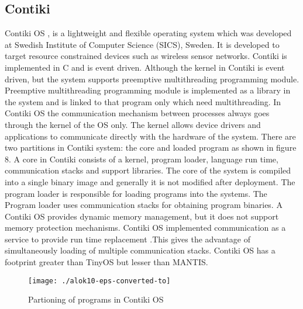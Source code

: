 \documentclass[12pt,journal,communications surveys and tutorials]{IEEEtran}
\begin{document}
\subsection{Contiki}
Contiki OS \cite{1367266}, is a lightweight and flexible operating system which was developed at Swedish Institute of Computer Science (SICS), Sweden. It is developed to target resource constrained devices such as wireless sensor networks. Contiki is implemented in C and is event driven. Although the kernel in Contiki is event driven, but the system supports preemptive multithreading programming module. Preemptive multithreading programming module is implemented as a library in the system and is linked to that program only which need multithreading. In Contiki OS the communication mechanism between processes always goes through the kernel of the OS only. The kernel allows device drivers and applications to communicate directly with the hardware of the system. There are two partitions in Contiki system: the core and loaded program as shown in figure 8. A core in Contiki consists of a kernel, program loader, language run time, communication stacks and support libraries. The core of the system is compiled into a single binary image and generally it is not modified after deployment. The program loader is responsible for loading programs into the systems. The Program loader uses communication stacks for obtaining program binaries. A Contiki OS provides dynamic memory management, but it does not support memory protection mechanisms. Contiki OS implemented communication as a service to provide run time replacement .This gives the advantage of simultaneously loading of multiple communication stacks. Contiki OS has a footprint greater than TinyOS but lesser than MANTIS.
\begin{figure}[h]
\centering
\texttt{[image: ./alok10-eps-converted-to]}
\caption{Partioning of programs in Contiki OS}
\label{fig:alok10-eps-converted-to}
\end{figure}
\end{document}
